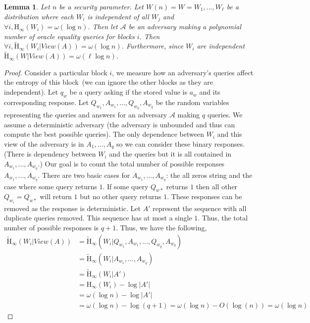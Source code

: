\documentclass[11pt]{article}
\newcommand{\consref}[1]{\mbox{Construction~\ref{#1}}}
\newcommand{\Hoo}{\mathrm{H}_\infty}
\newcommand{\Hav}{\tilde{\mathrm{H}}_\infty}
\newtheorem{lemma}[theorem]{Lemma}
\begin{document}
\begin{lemma}
\label{lem:blocks unguessable after queries}
Let $n$ be a security parameter.  Let $W(n) = W = W_1,..., W_\ell$ be a distribution where each $W_i$ is independent of all $W_j$ and $\forall i, \Hoo(W_i) = \omega(\log n)$.  Then let $\mathcal{A}$ be an adversary making a polynomial number of oracle equality queries for blocks $i$.  %
Then $\forall i, \Hav(W_i | View(A))  = \omega(\log n)$.  Furthermore, since $W_i$ are independent $\Hav(W | View(A))= \omega(\ell \log n)$.
\end{lemma}
\begin{proof}
Consider a particular block $i$, we measure how an adversary's queries affect the entropy of this block~(we can ignore the other blocks as they are independent).  
Let $q_w$ be a query asking if the stored value is $a_w$ and its corresponding response.  
Let $Q_{w_1},A_{w_1},..., Q_{w_q}, A_{w_q}$ be the random variables representing the queries and answers for an  adversary $\mathcal{A}$ making $q$ queries.  We assume a deterministic adversary (the adversary is unbounded and thus can compute the best possible queries).  The only dependence between $W_i$ and this view of the adversary is in $A_1,..., A_q$ so we can consider these binary responses.  (There is dependency between $W_i$ and the queries but it is all contained in $A_{w_1},..., A_{w_q}$.)  Our goal is to count the total number of possible responses $A_{w_1},..., A_{w_q}$.  There are two basic cases for $A_{w_1},..., A_{w_q}$: the all zeros string and the case where some query returns $1$.  If some query $Q_{w*}$ returns $1$ then all other $Q_{w_i} = Q_{w*}$ will return $1$ but no other query returns $1$.  These responses can be removed as the response is deterministic.  Let $A'$ represent the sequence with all duplicate queries removed.  This sequence has at most a single $1$.  Thus, the total number of possible responses is $q+1$.  Thus, we have the following,
\begin{align*}
\Hav(W_i | View(A)) &= \Hav(W_i| Q_{w_1}, A_{w_1},..., Q_{w_q}, A_{w_q})\\
&=\Hav(W_i | A_{w_1},..., A_{w_q})\\
&=\Hav(W_i |A') \\
&=\Hoo(W_i) - \log |A'|\\
&= \omega(\log n) - \log |A'|\\
&= \omega(\log n) - \log (q+1) = \omega(\log n) - O(\log(n)) = \omega(\log n)
\end{align*}

\end{proof}
\end{document}
